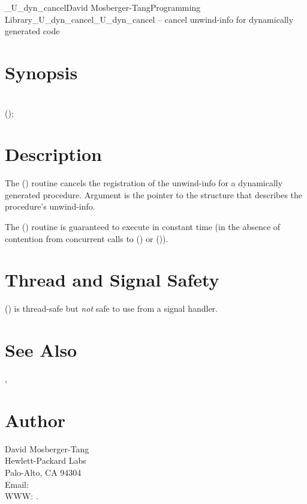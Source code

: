 \documentclass{article}
\begin{document}
\begin{Name}{3}{\_U\_dyn\_cancel}{David Mosberger-Tang}{Programming Library}{\_U\_dyn\_cancel}\_U\_dyn\_cancel -- cancel unwind-info for dynamically generated code
\end{Name}

\section{Synopsis}

\\

 ();\\

\section{Description}

The () routine cancels the registration of the
unwind-info for a dynamically generated procedure.  Argument 
is the pointer to the  structure that
describes the procedure's unwind-info.

The () routine is guaranteed to execute in
constant time (in the absence of contention from concurrent calls to
() or ()).


\section{Thread and Signal Safety}

() is thread-safe but \emph{not} safe to use
from a signal handler.

\section{See Also}

, 

\section{Author}

\noindent
David Mosberger-Tang\\
Hewlett-Packard Labs\\
Palo-Alto, CA 94304\\
Email: \\
WWW: .
\LatexManEnd
\end{document}
